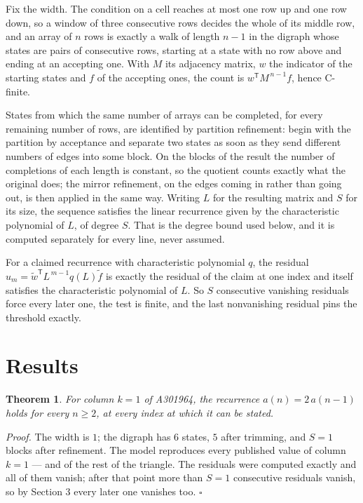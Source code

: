 \documentclass[11pt]{article}
\newtheorem{theorem}{Theorem}
\theoremstyle{definition}
\begin{document}
Fix the width. The condition on a cell reaches at most one row up and one row down, so a window of three consecutive rows decides the whole of its middle row, and an array of $n$ rows is exactly a walk of length $n-1$ in the digraph whose states are pairs of consecutive rows, starting at a state with no row above and ending at an accepting one. With $M$ its adjacency matrix, $w$ the indicator of the starting states and $f$ of the accepting ones, the count is $w^{\mathsf T}M^{\,n-1}f$, hence C-finite.

States from which the same number of arrays can be completed, for every remaining number of rows, are identified by partition refinement: begin with the partition by acceptance and separate two states as soon as they send different numbers of edges into some block. On the blocks of the result the number of completions of each length is constant, so the quotient counts exactly what the original does; the mirror refinement, on the edges coming in rather than going out, is then applied in the same way. Writing $L$ for the resulting matrix and $S$ for its size, the sequence satisfies the linear recurrence given by the characteristic polynomial of $L$, of degree $S$. That is the degree bound used below, and it is computed separately for every line, never assumed.

For a claimed recurrence with characteristic polynomial $q$, the residual $u_m = \tilde w^{\mathsf T}L^{\,m-1}q(L)\tilde f$ is exactly the residual of the claim at one index and itself satisfies the characteristic polynomial of $L$. So $S$ consecutive vanishing residuals force every later one, the test is finite, and the last nonvanishing residual pins the threshold exactly.

\section{Results}

\begin{theorem} For column $k = 1$ of A301964, the recurrence $a(n) = 2\,a(n-1)$ holds for every $n \ge 2$, at every index at which it can be stated.\end{theorem}

{\itshape Proof.} The width is $1$; the digraph has $6$ states, $5$ after trimming, and $S = 1$ blocks after refinement. The model reproduces every published value of column $k = 1$ --- and of the rest of the triangle. The residuals were computed exactly and all of them vanish; after that point more than $S = 1$ consecutive residuals vanish, so by Section 3 every later one vanishes too. $\square$
\end{document}
